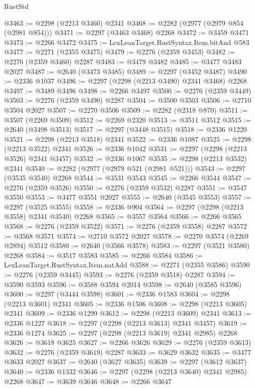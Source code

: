 \begin{lexlean}{RustStd}
\begin{coremodule}
@3463 := @2298 (@2213 @3460) @2341
@3468 := @2282 (@2977 (@2979 @854 (@2981 @854)))
@3471 := @2297 (@3463 @3468) @2268
@3472 := @3459 @3471
@3473 := @2266 @3472
@3475 := LexLeanTarget.RustSyntax.Item.bitAnd @583
@3477 := @2271 (@2355 @3475)
@3479 := @2276 (@2359 @3453)
@3482 := @2276 (@2359 @3460) @2287
@3483 := @3479 @3482
@3485 := @3477 @3483 @2027
@3487 := @2640 (@3473 @3485)
@3489 := @2297 (@3452 @3487)
@3490 := @2336 @1037
@3496 := @2297 (@2298 (@2213 @3490) @2341 @3468) @2268
@3497 := @3489 @3496
@3498 := @2266 @3497
@3500 := @2276 (@2359 @3449)
@3503 := @2276 (@2359 @3490) @2287
@3504 := @3500 @3503
@3506 := @2710 @3504 @2027
@3507 := @2270 @3506
@3509 := @2282 (@2318 @870)
@3511 := @3507 (@2269 @3509)
@3512 := @2269 @2320
@3513 := @3511 @3512
@3515 := @2640 (@3498 @3513)
@3517 := @2297 (@3448 @3515)
@3518 := @2336 @1220
@3521 := @2298 (@2213 @3518) @2341
@3522 := @2336 @1087
@3525 := @2298 (@2213 @3522) @2341
@3526 := @2336 @1042
@3531 := @2297 (@2298 (@2213 @3526) @2341 @3457)
@3532 := @2336 @1067
@3535 := @2298 (@2213 @3532) @2341
@3540 := @2282 (@2977 (@2979 @521 (@2981 @521)))
@3543 := @2297 (@3535 @3540) @2268
@3544 := @3531 @3543
@3545 := @2266 @3544
@3547 := @2276 (@2359 @3526)
@3550 := @2276 (@2359 @3532) @2287
@3551 := @3547 @3550
@3553 := @3477 @3551 @2027
@3555 := @2640 (@3545 @3553)
@3557 := @2297 (@3525 @3555)
@3558 := @2336 @904
@3564 := @2297 (@2298 (@2213 @3558) @2341 @3540) @2268
@3565 := @3557 @3564
@3566 := @2266 @3565
@3568 := @2276 (@2359 @3522)
@3571 := @2276 (@2359 @3558) @2287
@3572 := @3568 @3571
@3574 := @2710 @3572 @2027
@3578 := @2270 @3574 (@2269 @2894) @3512
@3580 := @2640 (@3566 @3578)
@3583 := @2297 (@3521 @3580) @2268
@3584 := @3517 @3583
@3585 := @2266 @3584
@3586 := LexLeanTarget.RustSyntax.Item.natAdd
@3588 := @2271 (@2355 @3586)
@3590 := @2276 (@2359 @3445)
@3593 := @2276 (@2359 @3518) @2287
@3594 := @3590 @3593
@3596 := @3588 @3594 @2014
@3598 := @2640 (@3585 @3596)
@3600 := @2297 (@3444 @3598)
@3601 := @2336 @1583
@3604 := @2298 (@2213 @3601) @2341
@3605 := @2336 @1506
@3608 := @2298 (@2213 @3605) @2341
@3609 := @2336 @1299
@3612 := @2298 (@2213 @3609) @2341
@3613 := @2336 @1227
@3618 := @2297 (@2298 (@2213 @3613) @2341 @3457)
@3619 := @2336 @1274
@3625 := @2297 (@2298 (@2213 @3619) @2341 @2985) @2268
@3626 := @3618 @3625
@3627 := @2266 @3626
@3629 := @2276 (@2359 @3613)
@3632 := @2276 (@2359 @3619) @2287
@3633 := @3629 @3632
@3635 := @3477 @3633 @2027
@3637 := @2640 (@3627 @3635)
@3639 := @2297 (@3612 @3637)
@3640 := @2336 @1332
@3646 := @2297 (@2298 (@2213 @3640) @2341 @2985) @2268
@3647 := @3639 @3646
@3648 := @2266 @3647

\end{coremodule}
\end{lexlean}
